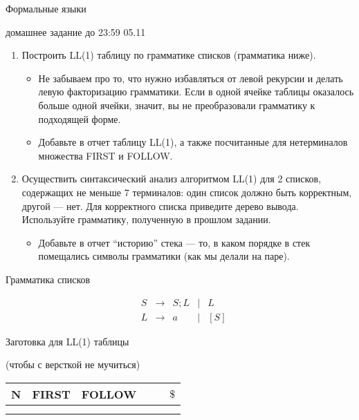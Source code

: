 \documentclass[12pt]{article}
\begin{document}
\begin{center} {\LARGE Формальные языки} \end{center}

\begin{center} \Large домашнее задание до 23:59 05.11 \end{center}
\bigskip

\begin{enumerate}
  \item
  {
    Построить LL(1) таблицу по грамматике списков (грамматика ниже).
    \begin{itemize}
      \item Не забываем про то, что нужно избавляться от левой рекурсии и делать левую факторизацию грамматики. Если в одной ячейке таблицы оказалось больше одной ячейки, значит, вы не преобразовали грамматику к подходящей форме.
      \item Добавьте в отчет таблицу LL(1), а также посчитанные для нетерминалов множества FIRST и FOLLOW.
    \end{itemize}
  }
  \item
  {
    Осуществить синтаксический анализ алгоритмом LL(1) для 2 списков, содержащих не меньше 7 терминалов: один список должно быть корректным, другой --- нет. Для корректного списка приведите дерево вывода. Используйте грамматику, полученную в прошлом задании.
    \begin{itemize}
      \item Добавьте в отчет ``историю'' стека --- то, в каком порядке в стек помещались символы грамматики (как мы делали на паре).
    \end{itemize}
  }
\end{enumerate}

\bigskip

\begin{center} Грамматика списков \end{center}

    $$
    \begin{array}{cccccccccc}
       &S & \rightarrow & S ; L & \mid & L \\
       &L & \rightarrow & a & \mid & [S]
    \end{array}
    $$

    \bigskip

    \begin{center} Заготовка для LL(1) таблицы

    (чтобы с версткой не мучиться)
    \end{center}
    \begin{center}
    \begin{tabular}{ l || c | c || c | c | c }
      N & FIRST & FOLLOW &  &  & $ \$ $ \\ \hline
        &       &        &  &  & \\
        &       &        &  &  &

    \end{tabular}
    \end{center}
\end{document}
